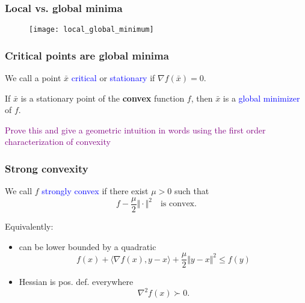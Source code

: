 \documentclass{beamer}
\begin{document}
\begin{frame}
  \frametitle{Local vs. global minima}
  \begin{figure}[ht]
    \centering
    \texttt{[image: local\_global\_minimum]}
  \end{figure}


\end{frame}


\begin{frame}
  \frametitle{Critical points are global minima}

  \begin{definition}
    We call a point $\bar{x}$ \textcolor{blue}{critical} or \textcolor{blue}{stationary} if
    $\nabla f(\bar{x}) = 0$.
  \end{definition}
  \begin{lemma}%
    If $\bar{x}$ is a stationary point of the \textbf{convex} function $f$, then $\bar{x}$ is a \textcolor{blue}{global minimizer} of $f$.
  \end{lemma}
  \textcolor{purple}{Prove this and give a geometric intuition in words using the first order characterization of convexity}

\end{frame}


\begin{frame}
  \frametitle{Strong convexity}
  \begin{definition}
    We call $f$ \textcolor{blue}{strongly convex} if there exist $\mu> 0$ such that
    \begin{equation}
      f - \frac{\mu}{2} \Vert \cdot \Vert^2 \quad \text{is convex.}
    \end{equation}
  \end{definition}

  Equivalently:
  \begin{itemize}
    \item can be lower bounded by a quadratic
          \begin{equation}
            f(x) + \langle \nabla f(x), y-x \rangle + \frac{\mu}{2} \Vert y-x \Vert^2 \le f(y)
          \end{equation}
    \item Hessian is pos. def. everywhere
          \begin{equation}
            \nabla^2 f(x) \succ 0.
          \end{equation}
  \end{itemize}

\end{frame}
\end{document}
